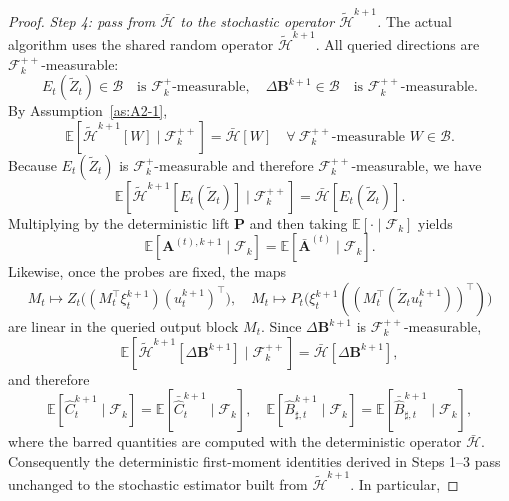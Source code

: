 \documentclass{pkumelon}
\theoremstyle{plain}
\newcommand{\E}{\mathbb{E}}
\begin{document}
\begin{proof}
\emph{Step 4: pass from $\bar{\mathcal H}$ to the stochastic operator $\tilde{\mathcal H}^{k+1}$.} The actual algorithm uses the shared random operator $\tilde{\mathcal H}^{k+1}$. All queried directions are $\mathcal F_k^{++}$-measurable:
\begin{equation*}
E_t(\tilde Z_t)\in\mathcal B\quad\text{is }\mathcal F_k^+\text{-measurable}, \quad \Delta\boldsymbol B^{k+1}\in\mathcal B\quad\text{is }\mathcal F_k^{++}\text{-measurable}.
\end{equation*}
By Assumption~\ref{as:A2-1},
\begin{equation*}
\E[\tilde{\mathcal H}^{k+1}[W]\mid \mathcal F_k^{++}] = \bar{\mathcal H}[W] \quad \forall\ \mathcal F_k^{++}\text{-measurable }W\in\mathcal B.
\end{equation*}
Because $E_t(\tilde Z_t)$ is $\mathcal F_k^+$-measurable and therefore $\mathcal F_k^{++}$-measurable, we have
\begin{equation*}
\E[\tilde{\mathcal H}^{k+1}[E_t(\tilde Z_t)]\mid \mathcal F_k^{++}] = \bar{\mathcal H}[E_t(\tilde Z_t)].
\end{equation*}
Multiplying by the deterministic lift $\boldsymbol P$ and then taking $\E[\cdot\mid \mathcal F_k]$ yields
\begin{equation*}
\E[\boldsymbol A^{(t),k+1}\mid \mathcal F_k] = \E[\bar{\boldsymbol A}^{(t)}\mid \mathcal F_k].
\end{equation*}
Likewise, once the probes are fixed, the maps
\begin{equation*}
M_t\longmapsto Z_t\bigl((M_t^\top\xi_t^{k+1})(u_t^{k+1})^\top\bigr), \quad M_t\longmapsto P_t\bigl(\xi_t^{k+1}((M_t^\top(\tilde Z_tu_t^{k+1}))^\top)\bigr)
\end{equation*}
are linear in the queried output block $M_t$. Since $\Delta\boldsymbol B^{k+1}$ is $\mathcal F_k^{++}$-measurable,
\begin{equation*}
\E[\tilde{\mathcal H}^{k+1}[\Delta\boldsymbol B^{k+1}]\mid \mathcal F_k^{++}] = \bar{\mathcal H}[\Delta\boldsymbol B^{k+1}],
\end{equation*}
and therefore
\begin{equation*}
\E[\widehat C_t^{k+1}\mid \mathcal F_k] = \E[\bar{\widehat C}_t^{k+1}\mid \mathcal F_k], \quad \E[\widehat B_{\sharp,t}^{k+1}\mid \mathcal F_k] = \E[\bar{\widehat B}_{\sharp,t}^{k+1}\mid \mathcal F_k],
\end{equation*}
where the barred quantities are computed with the deterministic operator $\bar{\mathcal H}$. Consequently the deterministic first-moment identities derived in Steps 1--3 pass unchanged to the stochastic estimator built from $\tilde{\mathcal H}^{k+1}$. In particular,

\end{proof}
\end{document}
